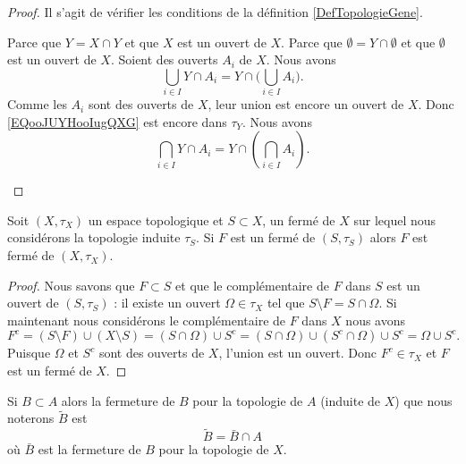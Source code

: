 \begin{proof}
	Il s'agit de vérifier les conditions de la définition \ref{DefTopologieGene}.

	\begin{subproof}
		\spitem[\( Y\in \tau_Y\)]
		Parce que \( Y=X\cap Y\) et que \( X\) est un ouvert de \( X\).
		Parce que \( \emptyset = Y\cap\emptyset\) et que \( \emptyset\) est un ouvert de \( X\).
		Soient des ouverts \( A_i\) de \( X\). Nous avons
		\begin{equation}        \label{EQooJUYHooIugQXG}
			\bigcup_{i\in I}Y\cap A_i=Y\cap\big( \bigcup_{i\in I}A_i \big).
		\end{equation}
		Comme les \( A_i\) sont des ouverts de \( X\), leur union est encore un ouvert de \( X\). Donc \eqref{EQooJUYHooIugQXG} est encore dans \( \tau_Y\).
		Nous avons
		\begin{equation}
			\bigcap_{i\in I}Y\cap A_i=Y\cap\left( \bigcap_{i\in I}A_i \right).
		\end{equation}
	\end{subproof}
\end{proof}


\begin{lemma}        \label{LemBWSUooCCGvax}
	Soit \( (X,\tau_X)\) un espace topologique et \( S\subset X\), un fermé de \( X\) sur lequel nous considérons la topologie induite \( \tau_S\). Si \( F\) est un fermé de \( (S,\tau_S)\) alors \( F\) est fermé de \( (X,\tau_X)\).
\end{lemma}

\begin{proof}
	Nous savons que \( F\subset S\) et que le complémentaire de \( F\) dans \( S\) est un ouvert de \( (S,\tau_S)\) : il existe un ouvert \( \Omega\in \tau_X\) tel que \( S\setminus F=S\cap \Omega\). Si maintenant nous considérons le complémentaire de \( F\) dans \( X\) nous avons
	\begin{equation}
		F^c=(S\setminus F)\cup (X\setminus S)=(S\cap \Omega)\cup S^c=(S\cap \Omega)\cup(S^c\cap \Omega)\cup S^c=\Omega\cup S^c.
	\end{equation}
	Puisque \( \Omega\) et \( S^c\) sont des ouverts de \( X\), l'union est un ouvert. Donc \( F^c\in \tau_X\) et \( F\) est un fermé de \( X\).
\end{proof}

\begin{lemma}       \label{LemkUYkQt}
	Si \( B\subset A\) alors la fermeture de \( B\) pour la topologie de \( A\) (induite de \( X\)) que nous noterons \( \tilde B\) est
	\begin{equation}
		\tilde B=\bar B\cap A
	\end{equation}
	où \( \bar B\) est la fermeture de \( B\) pour la topologie de \( X\).
\end{lemma}

